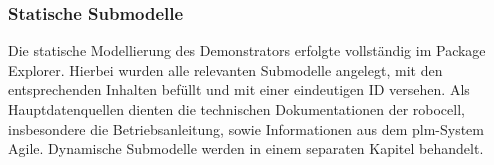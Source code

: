 




\newpage
\subsubsection{Statische Submodelle}
Die statische Modellierung des Demonstrators erfolgte vollständig im Package Explorer.
Hierbei wurden alle relevanten Submodelle angelegt, mit den entsprechenden Inhalten befüllt und mit einer eindeutigen ID versehen.
Als Hauptdatenquellen dienten die technischen Dokumentationen der robocell, insbesondere die Betriebsanleitung, sowie Informationen aus dem \acs{plm}-System Agile.
Dynamische Submodelle werden in einem separaten Kapitel behandelt.

